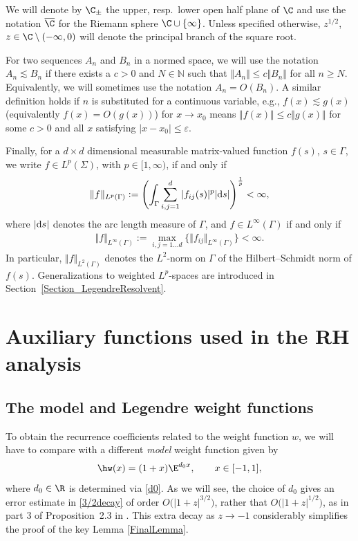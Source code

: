 We will denote by $\C_\pm$ the upper, resp.~lower open half plane of $\C$ and use the notation $\overline{\C}$ for the Riemann sphere $\C \cup \lbrace \infty \rbrace$. Unless specified otherwise, $z^{1/2}$, $z \in \C \setminus (-\infty, 0)$ will denote the principal branch of the square root.

For two sequences $A_n$ and $B_n$ in a normed space, we will use the notation $A_n \lesssim B_n$ if there exists a $c > 0$ and $N \in \mathbb{N}$ such that $\Vert A_n \Vert\leq c\Vert B_n \Vert$ for all $n \geq N$. Equivalently, we will sometimes use the notation $A_n = O(B_n)$. A similar definition holds if $n$ is substituted for a continuous variable, e.g., $f(x) \lesssim g(x)$ (equivalently $f(x) = O(g(x))$) for $x \to x_0$ means $\Vert f(x) \Vert \leq c \Vert g(x) \Vert$ for some $c > 0$ and all $x$ satisfying $|x-x_0| \leq \varepsilon$.

Finally, for a $d\times d$ dimensional measurable matrix-valued function $f(s)$, $s \in \Gamma$, we write $f \in L^p(\Sigma)$, with $p \in [1,\infty)$, if and only if \begin{align*}
 \Vert f \Vert_{L^p(\Gamma)} := \Biggl(\int_\Gamma \sum_{i,j=1}^d |f_{ij}(s)|^p |{\rm d}s|\Biggr)^{\frac{1}{p}} < \infty,
\end{align*}
where $|{\rm d}s|$ denotes the arc length measure of $\Gamma$, and $f \in L^\infty(\Gamma)$ if and only if
\begin{align*}
 \Vert f \Vert_{L^\infty(\Gamma)} := \max_{i,j = 1 \dots d}\lbrace \Vert f_{ij} \Vert_{L^\infty(\Gamma)}\rbrace < \infty.
\end{align*}
In particular, $\Vert f \Vert_{L^2(\Gamma)}$ denotes the $L^2$-norm on $\Gamma$ of the Hilbert--Schmidt norm of $f(s)$.
Generalizations to weighted $L^p$-spaces are introduced in Section~\ref{Section_LegendreResolvent}.


\section{Auxiliary functions used in the RH analysis}
\label{AuxiliaryFunctions}
\subsection{The model and Legendre weight functions}
To obtain the recurrence coefficients related to the weight function $w$, we will have to compare with a different \emph{model} weight function given by
\begin{align*}%
 \hw(x) = (1+x)\E^{d_0x}, \qquad x \in [-1,1],
\end{align*}
where $d_0 \in \R$ is determined via \eqref{d0}. As we will see, the choice of $d_0$ gives an error estimate in \eqref{3/2decay} of order $O\big(|1+z|^{3/2}\big)$, rather that $O\big(|1+z|^{1/2}\big)$, as in part 3 of Proposition~2.3 in \cite{CD}. This extra decay as $z \to -1$ considerably simplifies the proof of the key Lemma \ref{FinalLemma}.

